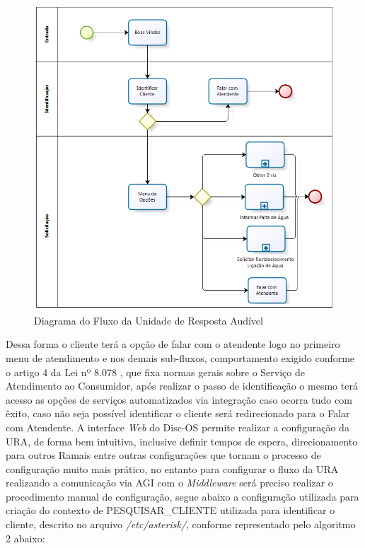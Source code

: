 \begin{figure}[!htb]
	\centering
	\caption{Diagrama do Fluxo da Unidade de Resposta Audível}
	\label{figura:fluxoURA}	
	\includegraphics{figuras/fluxo_ura.png}
\end{figure}


Dessa forma o cliente terá a opção de falar com o atendente logo no primeiro menu de atendimento e nos demais sub-fluxos, comportamento exigido conforme o artigo 4 da Lei nº 8.078 \cite{leiAtendimentoAoConsumidor}, que fixa normas gerais sobre o Serviço de Atendimento ao Consumidor, após realizar o passo de identificação o mesmo terá acesso as opções de serviços automatizados via integração caso ocorra tudo com êxito, caso não seja possível identificar o cliente será redirecionado para o Falar com Atendente.
A interface \textit{Web} do Disc-OS permite realizar a configuração da URA, de forma bem intuitiva, inclusive definir tempos de espera, direcionamento para outros Ramais entre outras configurações que tornam o processo de configuração muito mais prático, no entanto para configurar o fluxo da URA realizando a comunicação via AGI com o \textit{Middleware} será preciso realizar o procedimento manual de configuração, segue abaixo a configuração utilizada para criação do contexto de PESQUISAR\_CLIENTE utilizada para identificar o cliente, descrito no arquivo \textit{/etc/asterisk/}, conforme representado pelo algoritmo 2 abaixo:


